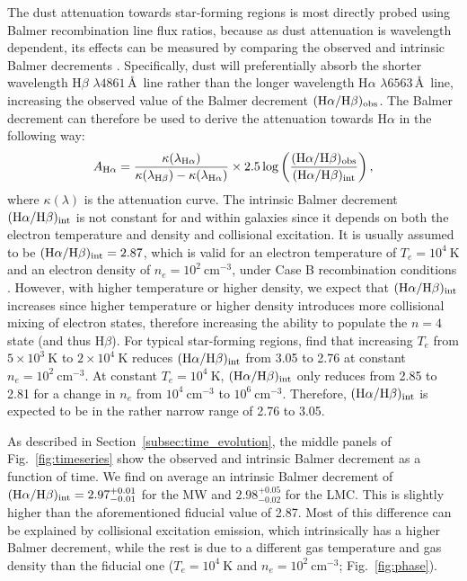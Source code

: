 \documentclass[fleqn,usenatbib]{mnras}
\begin{document}
The dust attenuation towards star-forming regions is most directly probed using Balmer recombination line flux ratios, because as dust attenuation is wavelength dependent, its effects can be measured by comparing the observed and intrinsic Balmer decrements \citep[e.g.,][]{calzetti97}. Specifically, dust will preferentially absorb the shorter wavelength H$\beta$ $\lambda4861$\,\AA\ line rather than the longer wavelength H$\alpha$ $\lambda6563$\,\AA\ line, increasing the observed value of the Balmer decrement $(\mathrm{H}\alpha/\mathrm{H}\beta)_{\rm obs}$. The Balmer decrement can therefore be used to derive the attenuation towards H$\alpha$ in the following way:
\begin{equation}
    A_{\rm H\alpha} = \frac{\kappa(\lambda_{\rm H\alpha})}{\kappa(\lambda_{\rm H\beta})-\kappa(\lambda_{\rm H\alpha})} \times 2.5 \log\left(\frac{(\mathrm{H}\alpha/\mathrm{H}\beta)_{\rm obs}}{(\mathrm{H}\alpha/\mathrm{H}\beta)_{\rm int}}\right),
\label{eq:balmer}
\end{equation}
where $\kappa(\lambda)$ is the attenuation curve. The intrinsic Balmer decrement $(\mathrm{H}\alpha/\mathrm{H}\beta)_{\rm int}$ is not constant for and within galaxies since it depends on both the electron temperature and density and collisional excitation. It is usually assumed to be $(\mathrm{H}\alpha/\mathrm{H}\beta)_{\rm int}=2.87$, which is valid for an electron temperature of $T_{e}=10^4~\mathrm{K}$ and an electron density of $n_e = 10^2~\mathrm{cm}^{-3}$, under Case B recombination conditions \citep{osterbrock06}. However, with higher temperature or higher density, we expect that $(\mathrm{H}\alpha/\mathrm{H}\beta)_{\rm int}$ increases since higher temperature or higher density introduces more collisional mixing of electron states, therefore increasing the ability to populate the $n=4$ state (and thus $\mathrm{H}\beta$). For typical star-forming regions, \citet[][see also \citealt{dopita03}]{osterbrock06} find that increasing $T_{e}$ from $5\times10^3~\mathrm{K}$ to $2\times10^4~\mathrm{K}$ reduces $(\mathrm{H}\alpha/\mathrm{H}\beta)_{\rm int}$ from 3.05 to 2.76 at constant $n_e = 10^2~\mathrm{cm}^{-3}$. At constant $T_{e}=10^4~\mathrm{K}$, $(\mathrm{H}\alpha/\mathrm{H}\beta)_{\rm int}$ only reduces from 2.85 to 2.81 for a change in $n_e$ from $10^4~\mathrm{cm}^{-3}$ to $10^6~\mathrm{cm}^{-3}$. Therefore, $(\mathrm{H}\alpha/\mathrm{H}\beta)_{\rm int}$ is expected to be in the rather narrow range of 2.76 to 3.05. 

As described in Section~\ref{subsec:time_evolution}, the middle panels of Fig.~\ref{fig:timeseries} show the observed and intrinsic Balmer decrement as a function of time. We find on average an intrinsic Balmer decrement of $(\mathrm{H}\alpha/\mathrm{H}\beta)_{\rm int}=2.97_{-0.01}^{+0.01}$ for the MW and $2.98_{-0.02}^{+0.05}$ for the LMC. This is slightly higher than the aforementioned fiducial value of 2.87. Most of this difference can be explained by collisional excitation emission, which intrinsically has a higher Balmer decrement, while the rest is due to a different gas temperature and gas density than the fiducial one ($T_{e}=10^4~\mathrm{K}$ and $n_e = 10^2~\mathrm{cm}^{-3}$; Fig.~\ref{fig:phase}).
\end{document}
